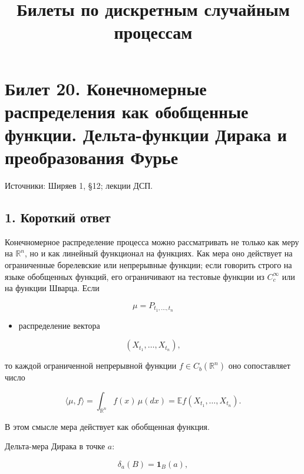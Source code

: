 \documentclass[
  11pt,
  a4paper,
]{article}
\title{Билеты по дискретным случайным процессам}
\author{}
\date{}
\providecommand{\tightlist}{%
  \setlength{\itemsep}{0pt}\setlength{\parskip}{0pt}}
\begin{document}
\maketitle

\section{Билет 20. Конечномерные распределения как обобщенные функции.
Дельта-функции Дирака и преобразования
Фурье}\label{ux431ux438ux43bux435ux442-20.-ux43aux43eux43dux435ux447ux43dux43eux43cux435ux440ux43dux44bux435-ux440ux430ux441ux43fux440ux435ux434ux435ux43bux435ux43dux438ux44f-ux43aux430ux43a-ux43eux431ux43eux431ux449ux435ux43dux43dux44bux435-ux444ux443ux43dux43aux446ux438ux438.-ux434ux435ux43bux44cux442ux430-ux444ux443ux43dux43aux446ux438ux438-ux434ux438ux440ux430ux43aux430-ux438-ux43fux440ux435ux43eux431ux440ux430ux437ux43eux432ux430ux43dux438ux44f-ux444ux443ux440ux44cux435}

Источники: Ширяев 1, §12; лекции ДСП.

\subsection{1. Короткий
ответ}\label{ux43aux43eux440ux43eux442ux43aux438ux439-ux43eux442ux432ux435ux442}

Конечномерное распределение процесса можно рассматривать не только как
меру на \(\mathbb R^n\), но и как линейный функционал на функциях. Как
мера оно действует на ограниченные борелевские или непрерывные функции;
если говорить строго на языке обобщенных функций, его ограничивают на
тестовые функции из \(C_c^\infty\) или на функции Шварца. Если

\[
\mu=P_{t_1,\ldots,t_n}
\]

\begin{itemize}
\tightlist
\item
  распределение вектора
\end{itemize}

\[
(X_{t_1},\ldots,X_{t_n}),
\]

то каждой ограниченной непрерывной функции \(f\in C_b(\mathbb R^n)\) оно
сопоставляет число

\[
\langle \mu,f\rangle
=
\int_{\mathbb R^n} f(x)\,\mu(dx)
=
\mathbb E f(X_{t_1},\ldots,X_{t_n}).
\]

В этом смысле мера действует как обобщенная функция.

Дельта-мера Дирака в точке \(a\):

\[
\delta_a(B)=\mathbf 1_B(a),
\]
\end{document}
